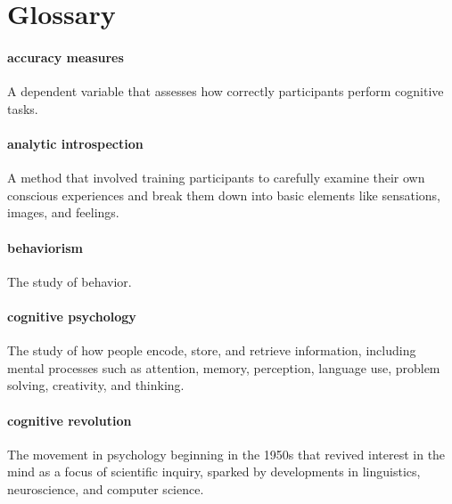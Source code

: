 \documentclass[
]{krantz}
\begin{document}
\section{Glossary}\label{glossary}

\paragraph*{accuracy measures}\label{accuracy-measures}

A dependent variable that assesses how correctly participants perform cognitive tasks.

\paragraph*{analytic introspection}\label{analytic-introspection}

A method that involved training participants to carefully examine their own conscious experiences and break them down into basic elements like sensations, images, and feelings.

\paragraph*{behaviorism}\label{behaviorism}

The study of behavior.

\paragraph*{cognitive psychology}\label{cognitive-psychology}

The study of how people encode, store, and retrieve information, including mental processes such as attention, memory, perception, language use, problem solving, creativity, and thinking.

\paragraph*{cognitive revolution}\label{cognitive-revolution-1}

The movement in psychology beginning in the 1950s that revived interest in the mind as a focus of scientific inquiry, sparked by developments in linguistics, neuroscience, and computer science.
\end{document}
